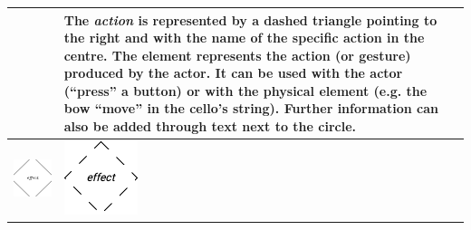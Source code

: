 \begin{longtable}{|m{}|m{}|m{}|}
    & 
    The \textit{action} is represented by a dashed triangle pointing to the right and with the name of the specific action in the centre. The element represents the action (or gesture) produced by the actor. It can be used with the actor (``press'' a button) or with the physical element (e.g. the bow ``move'' in the cello’s string). Further information can also be added through text next to the circle.
    \\\hline
    \centering
    \includegraphics[width=0.75\linewidth]{chapters/4-MDC_model_application/image/bvl-effect-o.png}
    &
    \centering
    \includegraphics[width=0.75\linewidth]{chapters/4-MDC_model_application/image/bvl-effect.png}

\end{longtable}
